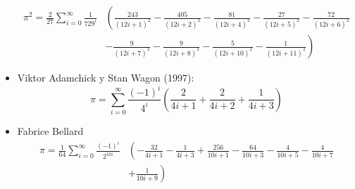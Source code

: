 \begin{itemize}
\begin{align*}
    \pi^{2}=\frac{2}{27}\sum_{i=0}^{\infty}\frac{1}{729^{i}}&
      \left(
        \frac{243}{(12i+1)^{2}}
        -\frac{405}{(12i+2)^{2}}
        -\frac{81}{(12i+4)^{2}}
        -\frac{27}{(12i+5)^{2}}
        -\frac{72}{(12i+6)^{2}}\right.\\
        &\left.-\frac{9}{(12i+7)^{2}}
        -\frac{9}{(12i+8)^{2}}
        -\frac{5}{(12i+10)^{2}}
        -\frac{1}{(12i+11)^{2}}
          \right)
  \end{align*}
\item Viktor Adamchick y Stan Wagon (1997):
  \begin{equation*}
    \pi = \sum_{i=0}^{\infty}\frac{(-1)^{i}}{4^{i}}
    \left(
      \frac{2}{4i+1}
      +\frac{2}{4i+2}
      +\frac{1}{4i+3}
    \right)
  \end{equation*}
\item Fabrice Bellard
  \begin{align*}
    \pi =\frac{1}{64}\sum_{i=0}^{\infty}\frac{(-1)^{i}}{2^{10i}}&
      \left(
        -\frac{32}{4i+1}
        -\frac{1}{4i+3}
        +\frac{256}{10i+1}
        -\frac{64}{10i+3}
        -\frac{4}{10i+5}
        -\frac{4}{10i+7}\right.\\
        &\left.+\frac{1}{10i+9}
          \right)
  \end{align*}
\end{itemize}